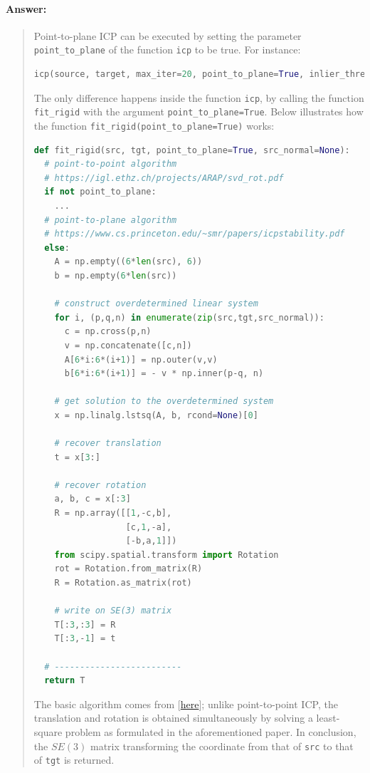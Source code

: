 \documentclass[11pt]{article}
\begin{document}
\paragraph{Answer:} 
\begin{quote}

Point-to-plane ICP can be executed by setting the parameter \texttt{point\_to\_plane} of the function \texttt{icp} to be true. For instance:

\begin{lstlisting}[language=Python, basicstyle=\scriptsize]
icp(source, target, max_iter=20, point_to_plane=True, inlier_thres=0.1)
\end{lstlisting}

The only difference happens inside the function \texttt{icp}, by calling the function \texttt{fit\_rigid} with the argument \texttt{point\_to\_plane=True}. Below illustrates how the function \texttt{fit\_rigid(point\_to\_plane=True)} works:

\begin{lstlisting}[language=Python, basicstyle=\scriptsize]
def fit_rigid(src, tgt, point_to_plane=True, src_normal=None):
  # point-to-point algorithm
  # https://igl.ethz.ch/projects/ARAP/svd_rot.pdf
  if not point_to_plane:
    ...
  # point-to-plane algorithm
  # https://www.cs.princeton.edu/~smr/papers/icpstability.pdf
  else:
    A = np.empty((6*len(src), 6))
    b = np.empty(6*len(src))

    # construct overdetermined linear system
    for i, (p,q,n) in enumerate(zip(src,tgt,src_normal)):
      c = np.cross(p,n)
      v = np.concatenate([c,n])
      A[6*i:6*(i+1)] = np.outer(v,v)
      b[6*i:6*(i+1)] = - v * np.inner(p-q, n)
    
    # get solution to the overdetermined system
    x = np.linalg.lstsq(A, b, rcond=None)[0]

    # recover translation
    t = x[3:]

    # recover rotation
    a, b, c = x[:3]
    R = np.array([[1,-c,b],
                  [c,1,-a],
                  [-b,a,1]])
    from scipy.spatial.transform import Rotation
    rot = Rotation.from_matrix(R)
    R = Rotation.as_matrix(rot)

    # write on SE(3) matrix
    T[:3,:3] = R
    T[:3,-1] = t
  
  # -------------------------
  return T
\end{lstlisting}

The basic algorithm comes from [\href{https://www.cs.princeton.edu/~smr/papers/icpstability.pdf}{here}]; unlike point-to-point ICP, the translation and rotation is obtained simultaneously by solving a least-square problem as formulated in the aforementioned paper. In conclusion, the $SE(3)$ matrix transforming the coordinate from that of \texttt{src} to that of \texttt{tgt} is returned.


\end{quote}
\end{document}
